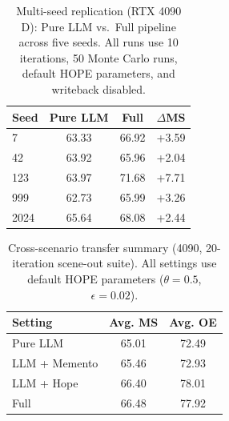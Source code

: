 \begin{table}[ht]
\centering
\caption{Multi-seed replication (RTX 4090 D): Pure LLM vs.\ Full pipeline
across five seeds. All runs use 10 iterations, 50 Monte Carlo runs, default
HOPE parameters, and writeback disabled.}
\label{tab:multiseed}
\small
\begin{tabular}{lccc}
\toprule
Seed & Pure LLM & Full & $\Delta$MS \\
\midrule

7 & 63.33 & 66.92 & +3.59 \\
42 & 63.92 & 65.96 & +2.04 \\
123 & 63.97 & 71.68 & +7.71 \\
999 & 62.73 & 65.99 & +3.26 \\
2024 & 65.64 & 68.08 & +2.44 \\
\bottomrule
\end{tabular}
\end{table}


\begin{table}[ht]
\centering
\caption{Cross-scenario transfer summary (4090, 20-iteration scene-out suite). All settings use default HOPE parameters ($\theta=0.5$, $\epsilon=0.02$).}
\label{tab:generalization-summary}
\small
\begin{tabular}{lcc}
\toprule
Setting & Avg. MS & Avg. OE \\
\midrule
Pure LLM & 65.01 & 72.49 \\
LLM + Memento & 65.46 & 72.93 \\
LLM + Hope & 66.40 & 78.01 \\
Full & 66.48 & 77.92 \\
\bottomrule
\end{tabular}
\end{table}

